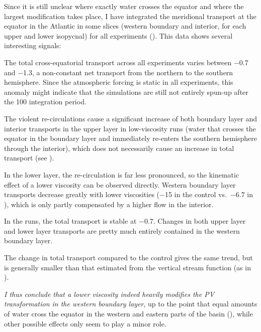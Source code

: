 Since it is still unclear where exactly water crosses the equator and where the largest modification takes place, I have integrated the meridional transport at the equator in the Atlantic in some slices (western boundary and interior, for each upper and lower isopycnal) for all experiments (). This data shows several interesting signals:
%
\begin{items}
	\item The total cross-equatorial transport across all experiments varies between \SI{-0.7}{\sv} and \SI{-1.3}{\sv}, \ie a non-constant net transport from the northern to the southern hemisphere. Since the atmospheric forcing is static in all experiments, this anomaly might indicate that the simulations are still not entirely spun-up after the \SI{100}{\year} integration period.
	\item The violent re-circulations cause a significant increase of both boundary layer and interior transports in the upper layer in low-viscosity runs (water that crosses the equator in the boundary layer and immediately re-enters the southern hemisphere through the interior), which does not necessarily cause an increase in total transport (see \eg {}).
	\item In the lower layer, the re-circulation is far less pronounced, so the kinematic effect of a lower viscosity can be observed directly. Western boundary layer transports decrease greatly with lower viscosities (\SI{-15}{\sv} in the control vs.~\SI{-6.7}{\sv} in ), which is only partly compensated by a higher flow in the interior.
	\item In the  runs, the total transport is stable at \SI{-0.7}{\sv}. Changes in both upper layer and lower layer transports are pretty much entirely contained in the western boundary layer.
	\item The change in total transport compared to the control gives the same trend, but is generally smaller than that estimated from the vertical stream function (as in ).
\end{items}

\parabreak

\emph{I thus conclude that a lower viscosity indeed heavily modifies the \ac{PV} transformation in the western boundary layer}, up to the point that equal amounts of water cross the equator in the western and eastern parts of the basin (), while other possible effects only seem to play a minor role.

